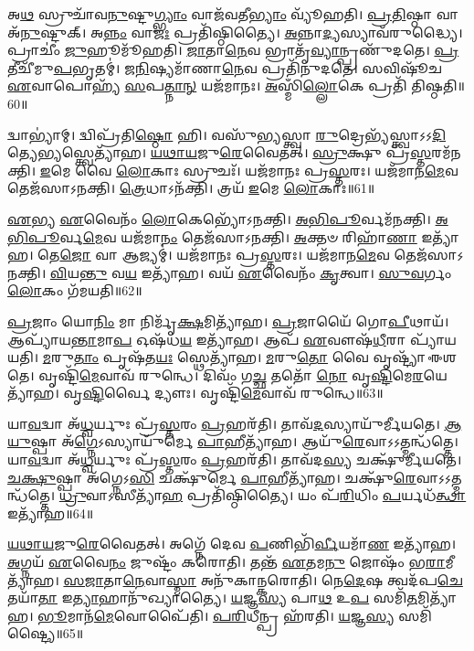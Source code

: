 𑌅\-\ul{𑌥} 𑌸𑍍𑌰𑍁𑌚𑌾᳴𑌵\-\ul{𑌨𑍁}\-𑌷𑍍𑌟𑍁\-\ul{𑌗𑍍𑌭𑍍𑌯𑌾𑌂} 𑌵𑌾𑌜᳴𑌵𑌤𑍀\-\ul{𑌭𑍍𑌯𑌾𑌂} 𑌵𑍍𑌯𑍂᳴𑌹𑌤𑌿।
\-\ul{𑌪𑍍𑌰}\-\-\ul{𑌤𑌿}\-𑌷𑍍𑌠𑌾 𑌵𑌾 𑌅᳴\-\ul{𑌨𑍁}\-𑌷𑍍𑌟𑍁𑌕𑍍।
𑌅\-\ul{𑌨𑍍𑌨𑌂} 𑌵𑌾\-\ul{𑌜𑌃} 𑌪𑍍𑌰𑌤𑌿᳴\-𑌷𑍍𑌠𑌿𑌤𑍍𑌯𑍈।
\-\ul{𑌅}\-𑌨𑍍𑌨𑌾\-\ul{𑌦𑍍𑌯}\-𑌸𑍍𑌯𑌾𑌵᳴𑌰𑍁𑌦𑍍𑌧𑍍𑌯𑍈।
𑌪𑍍𑌰𑌾𑌚𑍀𑌂॑ \ul{𑌜𑍁}\-𑌹𑍂𑌮𑍂᳴𑌹𑌤𑌿।
\-\ul{𑌜𑌾}\-𑌤𑌾\-\ul{𑌨𑍇}\-𑌵 𑌭𑍍𑌰𑌾𑌤𑍃᳴\-\ul{𑌵𑍍𑌯𑌾}\-𑌨𑍍𑌪𑍍𑌰𑌣𑍁᳴𑌦𑌤𑍇।
\-\ul{𑌪𑍍𑌰}\-𑌤𑍀𑌚𑍀᳴𑌮𑍁\-\ul{𑌪}\-𑌭𑍃𑌤𑌮𑍍॑।
\-\ul{𑌜}\-\-\ul{𑌨𑌿}\-𑌷𑍍𑌯𑌮𑌾᳴𑌣𑌾\-\ul{𑌨𑍇}\-𑌵 𑌪𑍍𑌰𑌤𑌿᳴\-𑌨𑍁𑌦𑌤𑍇।
𑌸𑌵𑌿𑌷𑍂᳴𑌚 \ul{𑌏}\-𑌵𑌾𑌪𑍋𑌹𑍍𑌯᳴ \ul{𑌸}\-𑌪\-\ul{𑌤𑍍𑌨𑌾}\-\-\ul{𑌨𑍍} 𑌯𑌜᳴𑌮𑌾𑌨𑌃।
\-\ul{𑌅}\-𑌸𑍍𑌮𑌿𑌁\-\ul{𑌲𑍍𑌲𑍋}\-𑌕𑍇 𑌪𑍍𑌰𑌤𑌿᳴ 𑌤𑌿𑌷𑍍𑌠𑌤𑌿॥60॥

𑌦𑍍𑌵𑌾𑌭𑍍𑌯𑌾॑𑌮𑍍।
𑌦𑍍𑌵𑌿𑌪𑍍𑌰᳴𑌤𑌿\-\ul{𑌷𑍍𑌠𑍋} 𑌹𑌿।
𑌵𑌸𑍁᳴𑌭𑍍𑌯𑌸𑍍𑌤𑍍𑌵𑌾 \ul{𑌰𑍁}\-𑌦𑍍𑌰𑍇𑌭𑍍𑌯᳴𑌸𑍍𑌤𑍍𑌵𑌾\-𑌽𑌽\-\ul{𑌦𑌿}\-𑌤𑍍𑌯𑍇\-\ul{𑌭𑍍𑌯}\-𑌸𑍍𑌤𑍍𑌵𑍇𑌤𑍍𑌯𑌾᳴𑌹।
\-\ul{𑌯}\-\-\ul{𑌥𑌾}\-\-\ul{𑌯}\-𑌜𑍁\-\ul{𑌰𑍇}\-𑌵𑍈𑌤𑌤𑍍।
\-\ul{𑌸𑍍𑌰𑍁}\-𑌕𑍍𑌷𑍁 𑌪𑍍𑌰᳴\-\ul{𑌸𑍍𑌤}\-𑌰𑌮᳴𑌨𑌕𑍍𑌤𑌿।
\-\ul{𑌇}\-𑌮𑍇 𑌵𑍈 \ul{𑌲𑍋}\-𑌕𑌾𑌃 𑌸𑍍𑌰𑍁𑌚𑌃᳴।
𑌯𑌜᳴𑌮𑌾𑌨𑌃 𑌪𑍍𑌰\-\ul{𑌸𑍍𑌤}\-𑌰𑌃।
𑌯𑌜᳴𑌮𑌾𑌨\-\ul{𑌮𑍇}\-𑌵 𑌤𑍇𑌜᳴𑌸𑌾\-𑌽𑌨𑌕𑍍𑌤𑌿।
\-\ul{𑌤𑍍𑌰𑍇}\-𑌧𑌾\-𑌽𑌨᳴𑌕𑍍𑌤𑌿।
𑌤𑍍𑌰𑌯᳴ \ul{𑌇}\-𑌮𑍇 \ul{𑌲𑍋}\-𑌕𑌾𑌃॥61॥

\-\ul{𑌏}\-𑌭𑍍𑌯 \ul{𑌏}\-𑌵𑍈𑌨𑌂᳴ \ul{𑌲𑍋}\-𑌕𑍇𑌭𑍍𑌯𑍋᳴\-𑌽𑌨𑌕𑍍𑌤𑌿।
\-\ul{𑌅}\-\-\ul{𑌭𑌿}\-\-\ul{𑌪𑍂}\-𑌰𑍍𑌵𑌮᳴𑌨𑌕𑍍𑌤𑌿।
\-\ul{𑌅}\-\-\ul{𑌭𑌿}\-\-\ul{𑌪𑍂}\-𑌰𑍍𑌵\-\ul{𑌮𑍇}\-𑌵 𑌯𑌜᳴𑌮𑌾\-\ul{𑌨𑌂} 𑌤𑍇𑌜᳴𑌸𑌾\-𑌽𑌨𑌕𑍍𑌤𑌿।
\-\ul{𑌅}\-𑌕𑍍𑌤𑍞 𑌰𑌿𑌹𑌾᳴\-\ul{𑌣𑌾} 𑌇𑌤𑍍𑌯𑌾᳴𑌹।
𑌤𑍇\-\ul{𑌜𑍋} 𑌵𑌾 𑌆𑌜𑍍𑌯𑌮𑍍॑।
𑌯𑌜᳴𑌮𑌾𑌨𑌃 𑌪𑍍𑌰\-\ul{𑌸𑍍𑌤}\-𑌰𑌃।
𑌯𑌜᳴𑌮𑌾𑌨\-\ul{𑌮𑍇}\-𑌵 𑌤𑍇𑌜᳴𑌸𑌾\-𑌽𑌨𑌕𑍍𑌤𑌿।
\-\ul{𑌵𑌿}\-𑌯\-\ul{𑌨𑍍𑌤𑍁} 𑌵\-\ul{𑌯} 𑌇𑌤𑍍𑌯𑌾᳴𑌹।
𑌵𑌯᳴ \ul{𑌏}\-𑌵𑍈𑌨𑌂᳴ \ul{𑌕𑍃}\-𑌤𑍍𑌵𑌾।
\-\ul{𑌸𑍁}\-\-\ul{𑌵}\-𑌰𑍍𑌗𑌂 \ul{𑌲𑍋}\-𑌕𑌂 𑌗᳴𑌮𑌯𑌤𑌿॥62॥

\-\ul{𑌪𑍍𑌰}\-𑌜𑌾𑌂 𑌯𑍋\-\ul{𑌨𑌿𑌂} 𑌮𑌾 𑌨𑌿𑌰𑍍𑌮𑍃᳴\-\ul{𑌕𑍍𑌷}\-𑌮𑌿𑌤𑍍𑌯𑌾᳴𑌹।
\-\ul{𑌪𑍍𑌰}\-𑌜𑌾𑌯𑍈᳴ 𑌗𑍋\-\ul{𑌪𑍀}\-𑌥𑌾𑌯᳴।
𑌆𑌪𑍍𑌯𑌾᳴𑌯\-\ul{𑌨𑍍𑌤𑌾}\-𑌮𑌾\-\ul{𑌪} 𑌓𑌷᳴𑌧\-\ul{𑌯} 𑌇𑌤𑍍𑌯𑌾᳴𑌹।
𑌆𑌪᳴ \ul{𑌏}\-𑌵𑍗𑌷᳴\-\ul{𑌧𑍀}\-𑌰𑌾 𑌪𑍍𑌯𑌾᳴𑌯𑌯𑌤𑌿।
\-\ul{𑌮}\-𑌰𑍁\-\ul{𑌤𑌾𑌂} 𑌪𑍃𑌷᳴𑌤\-\ul{𑌯𑌃} 𑌸𑍍𑌥𑍇𑌤𑍍𑌯𑌾᳴𑌹।
\-\ul{𑌮}\-𑌰𑍁\-\ul{𑌤𑍋} 𑌵𑍈 𑌵𑍃𑌷𑍍𑌟𑍍𑌯𑌾᳴ 𑌈𑌶𑌤𑍇।
𑌵𑍃𑌷𑍍𑌟𑌿᳴\-\ul{𑌮𑍇}\-𑌵𑌾𑌵᳴ 𑌰𑍁𑌨𑍍𑌧𑍇।
𑌦𑌿𑌵𑌂᳴ 𑌗\-\ul{𑌚𑍍𑌛} 𑌤𑌤𑍋᳴ \ul{𑌨𑍋} 𑌵𑍃\-\ul{𑌷𑍍𑌟𑌿}\-𑌮𑍇\-\ul{𑌰}\-𑌯𑍇𑌤𑍍𑌯𑌾᳴𑌹।
𑌵𑍃\-\ul{𑌷𑍍𑌟𑌿}\-𑌰𑍍𑌵𑍈 𑌦𑍍𑌯𑍗𑌃।
𑌵𑍃𑌷𑍍𑌟𑌿᳴\-\ul{𑌮𑍇}\-𑌵𑌾𑌵᳴ 𑌰𑍁𑌨𑍍𑌧𑍇॥63॥

𑌯𑌾\-\ul{𑌵}\-𑌦𑍍𑌵𑌾 𑌅᳴\-\ul{𑌧𑍍𑌵}\-𑌰𑍍𑌯𑍁𑌃 𑌪𑍍𑌰᳴\-\ul{𑌸𑍍𑌤}\-𑌰𑌂 \ul{𑌪𑍍𑌰}\-𑌹𑌰᳴𑌤𑌿।
𑌤𑌾𑌵᳴\-\ul{𑌦}\-𑌸𑍍𑌯𑌾𑌯𑍁᳴𑌰𑍍𑌮𑍀𑌯𑌤𑍇।
\-\ul{𑌆}\-\-\ul{𑌯𑍁}\-𑌷𑍍𑌪𑌾 𑌅᳴\-\ul{𑌗𑍍𑌨𑍇}\-\-𑌽𑌸𑍍𑌯𑌾𑌯𑍁᳴𑌰𑍍𑌮𑍇 \ul{𑌪𑌾}\-𑌹𑍀𑌤𑍍𑌯𑌾᳴𑌹।
𑌆𑌯𑍁᳴\-\ul{𑌰𑍇}\-𑌵𑌾𑌽𑌽𑌤𑍍𑌮𑌨𑍍𑌧᳴𑌤𑍍𑌤𑍇।
𑌯𑌾\-\ul{𑌵}\-𑌦𑍍𑌵𑌾 𑌅᳴\-\ul{𑌧𑍍𑌵}\-𑌰𑍍𑌯𑍁𑌃 𑌪𑍍𑌰᳴\-\ul{𑌸𑍍𑌤}\-𑌰𑌂 \ul{𑌪𑍍𑌰}\-𑌹𑌰᳴𑌤𑌿।
𑌤𑌾𑌵᳴𑌦\-\ul{𑌸𑍍𑌯} 𑌚𑌕𑍍𑌷𑍁᳴𑌰𑍍𑌮𑍀𑌯𑌤𑍇।
\-\ul{𑌚}\-\-\ul{𑌕𑍍𑌷𑍁}\-𑌷𑍍𑌪𑌾 𑌅᳴𑌗𑍍𑌨𑍇𑌽\-\ul{𑌸𑌿} 𑌚𑌕𑍍𑌷𑍁᳴𑌰𑍍𑌮𑍇 \ul{𑌪𑌾}\-𑌹𑍀𑌤𑍍𑌯𑌾᳴𑌹।
𑌚𑌕𑍍𑌷𑍁᳴\-\ul{𑌰𑍇}\-𑌵𑌾𑌽𑌽𑌤𑍍𑌮𑌨𑍍𑌧᳴𑌤𑍍𑌤𑍇।
\-\ul{𑌧𑍍𑌰𑍁}\-𑌵𑌾\-𑌽𑌸𑍀𑌤𑍍𑌯𑌾᳴\-\ul{𑌹} 𑌪𑍍𑌰𑌤𑌿᳴\-𑌷𑍍𑌠𑌿𑌤𑍍𑌯𑍈।
𑌯𑌂 𑌪᳴\-\ul{𑌰𑌿}\-𑌧𑌿𑌂 \ul{𑌪}\-𑌰𑍍𑌯𑌧᳴\-\ul{𑌤𑍍𑌥𑌾} 𑌇𑌤𑍍𑌯𑌾᳴𑌹॥64॥

\-\ul{𑌯}\-\-\ul{𑌥𑌾}\-\-\ul{𑌯}\-𑌜𑍁\-\ul{𑌰𑍇}\-𑌵𑍈𑌤𑌤𑍍।
𑌅𑌗𑍍𑌨𑍇᳴ 𑌦𑍇𑌵 \ul{𑌪}\-𑌣𑌿𑌭𑌿᳴\-\ul{𑌰𑍍𑌵𑍀}\-𑌯𑌮𑌾᳴\-\ul{𑌣} 𑌇𑌤𑍍𑌯𑌾᳴𑌹।
\-\ul{𑌅}\-𑌗𑍍𑌨𑌯᳴ \ul{𑌏}\-𑌵𑍈\-\ul{𑌨𑌂} 𑌜𑍁𑌷𑍍𑌟𑌂᳴ 𑌕𑌰𑍋𑌤𑌿।
𑌤𑌨𑍍𑌤᳴ \ul{𑌏}\-𑌤𑌮\-\ul{𑌨𑍁} 𑌜𑍋𑌷𑌂᳴ 𑌭\-\ul{𑌰𑌾}\-𑌮𑍀𑌤𑍍𑌯𑌾᳴𑌹।
\-\ul{𑌸}\-\-\ul{𑌜𑌾}\-𑌤𑌾\-\ul{𑌨𑍇}\-𑌵𑌾\-\ul{𑌸𑍍𑌮𑌾} 𑌅𑌨𑍁᳴𑌕𑌾𑌨𑍍𑌕𑌰𑍋𑌤𑌿।
𑌨𑍇\-\ul{𑌦𑍇}\-𑌷 𑌤𑍍𑌵𑌦᳴𑌪\-\ul{𑌚𑍇}\-𑌤𑌯𑌾᳴\-\ul{𑌤𑌾} 𑌇\-\ul{𑌤𑍍𑌯𑌾}\-𑌹𑌾𑌨𑍁᳴𑌖𑍍𑌯𑌾𑌤𑍍𑌯𑍈।
\-\ul{𑌯}\-𑌜𑍍𑌞\-\ul{𑌸𑍍𑌯} 𑌪𑌾\-\ul{𑌥} 𑌉\-\ul{𑌪} 𑌸𑌮𑌿᳴\-\ul{𑌤}\-𑌮𑌿𑌤𑍍𑌯𑌾᳴𑌹।
\-\ul{𑌭𑍂}\-𑌮𑌾𑌨᳴\-\ul{𑌮𑍇}\-𑌵𑍋𑌪𑍈᳴𑌤𑌿।
\-\ul{𑌪}\-\-\ul{𑌰𑌿}\-𑌧𑍀𑌨𑍍𑌪𑍍𑌰 𑌹᳴𑌰𑌤𑌿।
\-\ul{𑌯}\-𑌜𑍍𑌞\-\ul{𑌸𑍍𑌯} 𑌸𑌮𑌿᳴𑌷𑍍𑌟𑍍𑌯𑍈॥65॥

